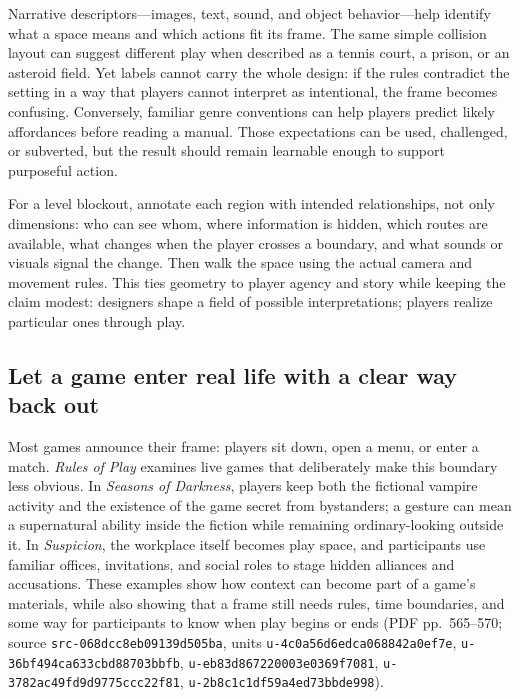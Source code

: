 Narrative descriptors---images, text, sound, and object behavior---help identify what a space means and which actions fit its frame. The same simple collision layout can suggest different play when described as a tennis court, a prison, or an asteroid field. Yet labels cannot carry the whole design: if the rules contradict the setting in a way that players cannot interpret as intentional, the frame becomes confusing. Conversely, familiar genre conventions can help players predict likely affordances before reading a manual. Those expectations can be used, challenged, or subverted, but the result should remain learnable enough to support purposeful action.

For a level blockout, annotate each region with intended relationships, not only dimensions: who can see whom, where information is hidden, which routes are available, what changes when the player crosses a boundary, and what sounds or visuals signal the change. Then walk the space using the actual camera and movement rules. This ties geometry to player agency and story while keeping the claim modest: designers shape a field of possible interpretations; players realize particular ones through play.

\subsection{Let a game enter real life with a clear way back out}\label{let-a-game-enter-real-life-with-a-clear-way-back-out}

Most games announce their frame: players sit down, open a menu, or enter a match. \emph{Rules of Play} examines live games that deliberately make this boundary less obvious. In \emph{Seasons of Darkness}, players keep both the fictional vampire activity and the existence of the game secret from bystanders; a gesture can mean a supernatural ability inside the fiction while remaining ordinary-looking outside it. In \emph{Suspicion}, the workplace itself becomes play space, and participants use familiar offices, invitations, and social roles to stage hidden alliances and accusations. These examples show how context can become part of a game's materials, while also showing that a frame still needs rules, time boundaries, and some way for participants to know when play begins or ends (PDF pp.~565--570; source \texttt{src-068dcc8eb09139d505ba}, units \texttt{u-4c0a56d6edca068842a0ef7e}, \texttt{u-36bf494ca633cbd88703bbfb}, \texttt{u-eb83d867220003e0369f7081}, \texttt{u-3782ac49fd9d9775ccc22f81}, \texttt{u-2b8c1c1df59a4ed73bbde998}).

